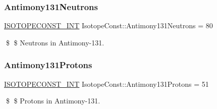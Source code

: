 \subsubsection{\texorpdfstring{Antimony131\+Neutrons}{Antimony131Neutrons}}
{\footnotesize\ttfamily \mbox{\hyperlink{group___isotope_const-_macros_ga5f18360b3e99483a35c32d789e62621c}{I\+S\+O\+T\+O\+P\+E\+C\+O\+N\+S\+T\+\_\+\+I\+NT}} Isotope\+Const\+::\+Antimony131\+Neutrons = 80}

\$ \$ Neutrons in Antimony-\/131. \mbox{\label{group___isotope_const-_antimony-_sb131_gaabe953a4d5ebc0118af1a71e52475316}} 
\subsubsection{\texorpdfstring{Antimony131\+Protons}{Antimony131Protons}}
{\footnotesize\ttfamily \mbox{\hyperlink{group___isotope_const-_macros_ga5f18360b3e99483a35c32d789e62621c}{I\+S\+O\+T\+O\+P\+E\+C\+O\+N\+S\+T\+\_\+\+I\+NT}} Isotope\+Const\+::\+Antimony131\+Protons = 51}

\$ \$ Protons in Antimony-\/131. 